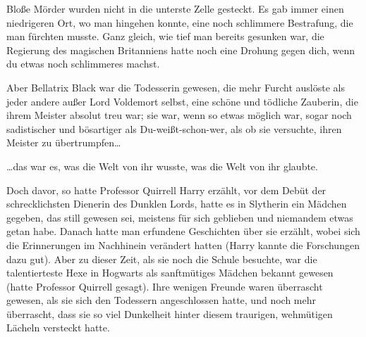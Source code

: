 Bloße Mörder wurden nicht in die unterste Zelle gesteckt. Es gab immer einen niedrigeren Ort, wo man hingehen konnte, eine noch schlimmere Bestrafung, die man fürchten musste. Ganz gleich, wie tief man bereits gesunken war, die Regierung des magischen Britanniens hatte noch eine Drohung gegen dich, wenn du etwas noch schlimmeres machst.

Aber Bellatrix Black war die Todesserin gewesen, die mehr Furcht auslöste als jeder andere außer Lord Voldemort selbst, eine schöne und tödliche Zauberin, die ihrem Meister absolut treu war; sie war, wenn so etwas möglich war, sogar noch sadistischer und bösartiger als Du-weißt-schon-wer, als ob sie versuchte, ihren Meister zu übertrumpfen…

…das war es, was die Welt von ihr wusste, was die Welt von ihr glaubte.

Doch davor, so hatte Professor Quirrell Harry erzählt, vor dem Debüt der schrecklichsten Dienerin des Dunklen Lords, hatte es in Slytherin ein Mädchen gegeben, das still gewesen sei, meistens für sich geblieben und niemandem etwas getan habe. Danach hatte man erfundene Geschichten über sie erzählt, wobei sich die Erinnerungen im Nachhinein verändert hatten (Harry kannte die Forschungen dazu gut). Aber zu dieser Zeit, als sie noch die Schule besuchte, war die talentierteste Hexe in Hogwarts als sanftmütiges Mädchen bekannt gewesen (hatte Professor Quirrell gesagt). Ihre wenigen Freunde waren überrascht gewesen, als sie sich den Todessern angeschlossen hatte, und noch mehr überrascht, dass sie so viel Dunkelheit hinter diesem traurigen, wehmütigen Lächeln versteckt hatte.

